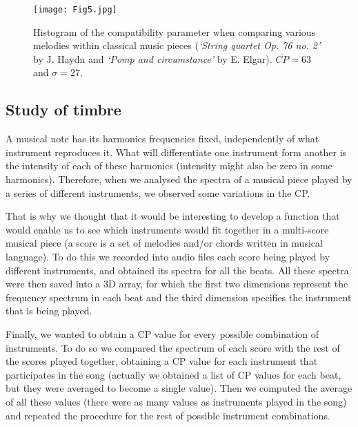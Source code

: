 \documentclass[twocolumn]{revtex4}
\begin{document}
\begin{figure}[h!]
\centering
\texttt{[image: Fig5.jpg]}
\caption{Histogram of the compatibility parameter when comparing various melodies within classical music pieces (\textsl{`String quartet Op. 76 no. 2'} by J. Haydn and \textsl{`Pomp and circumstance'} by E. Elgar). $\overline{CP} = 63$ and $\sigma = 27$.}
\end{figure}

\subsection{Study of timbre}

A musical note has its harmonics frequencies fixed, independently of what instrument reproduces it. What will differentiate one instrument form another is the intensity of each of these harmonics (intensity might also be zero in some harmonics). Therefore, when we analysed the spectra of a musical piece played by a series of different instruments, we observed some variations in the CP.

That is why we thought that it would be interesting to develop a function that would enable us to see which instruments would fit together in a multi-score musical piece (a score is a set of melodies and/or chords written in musical language). To do this we recorded into audio files each score being played by different instruments, and obtained its spectra for all the beats. All these spectra were then saved into a 3D array, for which the first two dimensions represent the frequency spectrum in each beat and the third dimension specifies the instrument that is being played. 


Finally, we wanted to obtain a CP value for every possible combination of instruments. To do so we compared the spectrum of each score with the rest of the scores played together, obtaining a CP value for each instrument that participates in the song (actually we obtained a list of CP values for each beat, but they were averaged to become a single value). Then we computed the average of all these values (there were as many values as instruments played in the song) and repeated the procedure for the rest of possible instrument combinations. 
\end{document}
